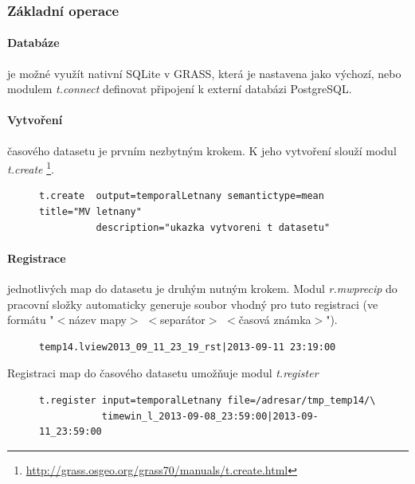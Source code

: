 \documentclass[a4paper,12pt,oneside]{report}
\begin{document}
\subsubsection{Základní operace}

\paragraph*{Databáze} je možné využít nativní SQLite v GRASS, která je
nastavena jako výchozí, nebo modulem \textit{t.connect} definovat
připojení k externí databázi PostgreSQL.

\paragraph*{Vytvoření } časového datasetu je prvním nezbytným
krokem. K jeho vytvoření slouží modul \textit{t.create}
\footnote{\url{http://grass.osgeo.org/grass70/manuals/t.create.html}}.
\begin{figure}[h!]
\begin{footnotesize}
\lstset{extendedchars=false,
escapeinside=''}
\begin{lstlisting}[style=mybash]
t.create  output=temporalLetnany semantictype=mean title="MV letnany"
          description="ukazka vytvoreni t datasetu"                        
\end{lstlisting}
\end{footnotesize} 
\end{figure}

\paragraph*{Registrace} jednotlivých map do datasetu je druhým nutným
krokem. Modul \textit{r.mwprecip} do pracovní složky automaticky
generuje soubor vhodný pro tuto registraci (ve formátu "$<$název
mapy$>$ $<$separátor$>$ $<$časová známka$>$").

\begin{figure}[h!]
\begin{footnotesize}
\lstset{extendedchars=false,
escapeinside=''}
\begin{lstlisting}[style=mybash]
temp14.lview2013_09_11_23_19_rst|2013-09-11 23:19:00                       
\end{lstlisting}
\end{footnotesize} 
\end{figure}

Registraci map do časového datasetu umožňuje modul \textit{t.register}
\begin{figure}[h!]
\begin{footnotesize}
\lstset{extendedchars=false,
escapeinside=''}
\begin{lstlisting}[style=mybash]
t.register input=temporalLetnany file=/adresar/tmp_temp14/\
           timewin_l_2013-09-08_23:59:00|2013-09-11_23:59:00        
\end{lstlisting}
\end{footnotesize} 
\end{figure}
\end{document}
